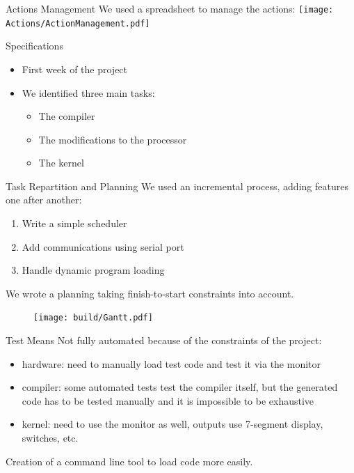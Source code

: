 \documentclass{beamer}
\begin{document}
      \begin{frame}{Actions Management}
        We used a spreadsheet to manage the actions:
          \texttt{[image: Actions/ActionManagement.pdf]}
      \end{frame}

      \begin{frame}{Specifications}
        \begin{itemize}
          \item First week of the project
          \item We identified three main tasks:
            \begin{itemize}
              \item The compiler
              \item The modifications to the processor
              \item The kernel
            \end{itemize}
          \end{itemize}
      \end{frame}

      \begin{frame}{Task Repartition and Planning}
          We used an incremental process, adding features one after another:
          \begin{enumerate}
            \item Write a simple scheduler
            \item Add communications using serial port
            \item Handle dynamic program loading
          \end{enumerate}

          We wrote a planning taking finish-to-start constraints into account.
      \end{frame}

      \begin{frame}[plain]
        \begin{figure}
          \texttt{[image: build/Gantt.pdf]}
        \end{figure}
      \end{frame}

      \begin{frame}{Test Means}
        Not fully automated because of the constraints of the project:
        \begin{itemize}
          \item hardware: need to manually load test code and test it via the
            monitor
          \item compiler: some automated tests test the compiler itself, but the
            generated code has to be tested manually and it is impossible to be
            exhaustive
          \item kernel: need to use the monitor as well, outputs use 7-segment
            display, switches, etc.
        \end{itemize}

        Creation of a command line tool to load code more easily.
      \end{frame}
\end{document}
